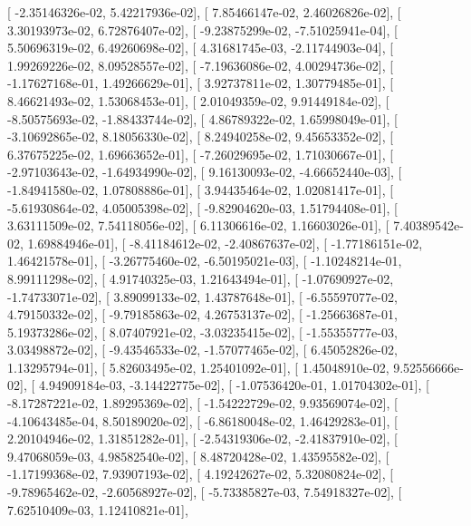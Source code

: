 \documentclass{article}
\begin{document}
       [ -2.35146326e-02,   5.42217936e-02],
       [  7.85466147e-02,   2.46026826e-02],
       [  3.30193973e-02,   6.72876407e-02],
       [ -9.23875299e-02,  -7.51025941e-04],
       [  5.50696319e-02,   6.49260698e-02],
       [  4.31681745e-03,  -2.11744903e-04],
       [  1.99269226e-02,   8.09528557e-02],
       [ -7.19636086e-02,   4.00294736e-02],
       [ -1.17627168e-01,   1.49266629e-01],
       [  3.92737811e-02,   1.30779485e-01],
       [  8.46621493e-02,   1.53068453e-01],
       [  2.01049359e-02,   9.91449184e-02],
       [ -8.50575693e-02,  -1.88433744e-02],
       [  4.86789322e-02,   1.65998049e-01],
       [ -3.10692865e-02,   8.18056330e-02],
       [  8.24940258e-02,   9.45653352e-02],
       [  6.37675225e-02,   1.69663652e-01],
       [ -7.26029695e-02,   1.71030667e-01],
       [ -2.97103643e-02,  -1.64934990e-02],
       [  9.16130093e-02,  -4.66652440e-03],
       [ -1.84941580e-02,   1.07808886e-01],
       [  3.94435464e-02,   1.02081417e-01],
       [ -5.61930864e-02,   4.05005398e-02],
       [ -9.82904620e-03,   1.51794408e-01],
       [  3.63111509e-02,   7.54118056e-02],
       [  6.11306616e-02,   1.16603026e-01],
       [  7.40389542e-02,   1.69884946e-01],
       [ -8.41184612e-02,  -2.40867637e-02],
       [ -1.77186151e-02,   1.46421578e-01],
       [ -3.26775460e-02,  -6.50195021e-03],
       [ -1.10248214e-01,   8.99111298e-02],
       [  4.91740325e-03,   1.21643494e-01],
       [ -1.07690927e-02,  -1.74733071e-02],
       [  3.89099133e-02,   1.43787648e-01],
       [ -6.55597077e-02,   4.79150332e-02],
       [ -9.79185863e-02,   4.26753137e-02],
       [ -1.25663687e-01,   5.19373286e-02],
       [  8.07407921e-02,  -3.03235415e-02],
       [ -1.55355777e-03,   3.03498872e-02],
       [ -9.43546533e-02,  -1.57077465e-02],
       [  6.45052826e-02,   1.13295794e-01],
       [  5.82603495e-02,   1.25401092e-01],
       [  1.45048910e-02,   9.52556666e-02],
       [  4.94909184e-03,  -3.14422775e-02],
       [ -1.07536420e-01,   1.01704302e-01],
       [ -8.17287221e-02,   1.89295369e-02],
       [ -1.54222729e-02,   9.93569074e-02],
       [ -4.10643485e-04,   8.50189020e-02],
       [ -6.86180048e-02,   1.46429283e-01],
       [  2.20104946e-02,   1.31851282e-01],
       [ -2.54319306e-02,  -2.41837910e-02],
       [  9.47068059e-03,   4.98582540e-02],
       [  8.48720428e-02,   1.43595582e-02],
       [ -1.17199368e-02,   7.93907193e-02],
       [  4.19242627e-02,   5.32080824e-02],
       [ -9.78965462e-02,  -2.60568927e-02],
       [ -5.73385827e-03,   7.54918327e-02],
       [  7.62510409e-03,   1.12410821e-01],
\end{document}
